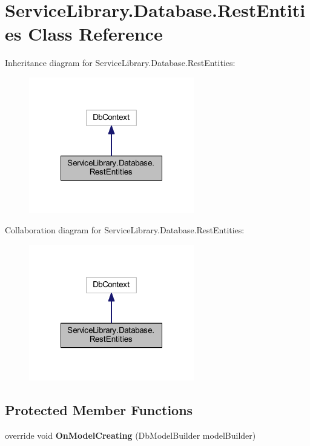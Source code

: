 \hypertarget{class_service_library_1_1_database_1_1_rest_entities}{\section{Service\-Library.\-Database.\-Rest\-Entities Class Reference}
\label{class_service_library_1_1_database_1_1_rest_entities}
}


Inheritance diagram for Service\-Library.\-Database.\-Rest\-Entities\-:\nopagebreak
\begin{figure}[H]
\begin{center}
\leavevmode
\includegraphics[width=204pt]{class_service_library_1_1_database_1_1_rest_entities__inherit__graph}
\end{center}
\end{figure}


Collaboration diagram for Service\-Library.\-Database.\-Rest\-Entities\-:\nopagebreak
\begin{figure}[H]
\begin{center}
\leavevmode
\includegraphics[width=204pt]{class_service_library_1_1_database_1_1_rest_entities__coll__graph}
\end{center}
\end{figure}
\subsection*{Protected Member Functions}
\begin{DoxyCompactItemize}
\item 
\hypertarget{class_service_library_1_1_database_1_1_rest_entities_ae6312489581da4a907f51a692245a2a5}{override void {\bfseries On\-Model\-Creating} (Db\-Model\-Builder model\-Builder)}\label{class_service_library_1_1_database_1_1_rest_entities_ae6312489581da4a907f51a692245a2a5}

\end{DoxyCompactItemize}
